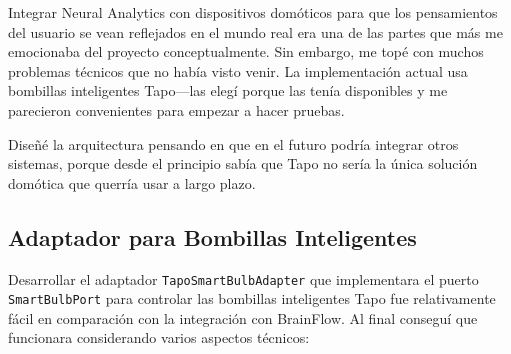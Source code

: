 Integrar Neural Analytics con dispositivos domóticos para que los pensamientos del usuario se vean reflejados en el mundo real era una de las partes que más me emocionaba del proyecto conceptualmente. Sin embargo, me topé con muchos problemas técnicos que no había visto venir. La implementación actual usa bombillas inteligentes Tapo—las elegí porque las tenía disponibles y me parecieron convenientes para empezar a hacer pruebas.

Diseñé la arquitectura pensando en que en el futuro podría integrar otros sistemas, porque desde el principio sabía que Tapo no sería la única solución domótica que querría usar a largo plazo.

\subsection{Adaptador para Bombillas Inteligentes}

Desarrollar el adaptador \texttt{TapoSmartBulbAdapter} que implementara el puerto \texttt{SmartBulbPort} para controlar las bombillas inteligentes Tapo fue relativamente fácil en comparación con la integración con BrainFlow. Al final conseguí que funcionara considerando varios aspectos técnicos:

